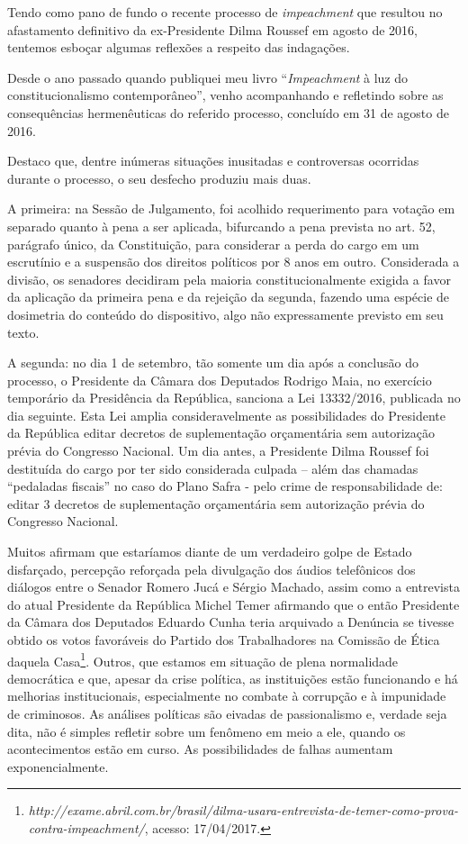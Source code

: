 Tendo como pano de fundo o recente processo de \emph{impeachment} que
resultou no afastamento definitivo da ex-Presidente Dilma Roussef em
agosto de 2016, tentemos esboçar algumas reflexões a respeito das
indagações.

Desde o ano passado quando publiquei meu livro ``\emph{Impeachment} à
luz do constitucionalismo contemporâneo'', venho acompanhando e
refletindo sobre as consequências hermenêuticas do referido processo,
concluído em 31 de agosto de 2016.

Destaco que, dentre inúmeras situações inusitadas e controversas
ocorridas durante o processo, o seu desfecho produziu mais duas.

A primeira: na Sessão de Julgamento, foi acolhido requerimento para
votação em separado quanto à pena a ser aplicada, bifurcando a pena
prevista no art. 52, parágrafo único, da Constituição, para considerar a
perda do cargo em um escrutínio e a suspensão dos direitos políticos por
8 anos em outro. Considerada a divisão, os senadores decidiram pela
maioria constitucionalmente exigida a favor da aplicação da primeira
pena e da rejeição da segunda, fazendo uma espécie de dosimetria do
conteúdo do dispositivo, algo não expressamente previsto em seu texto.

A segunda: no dia 1 de setembro, tão somente um dia após a conclusão do
processo, o Presidente da Câmara dos Deputados Rodrigo Maia, no
exercício temporário da Presidência da República, sanciona a Lei
13332/2016, publicada no dia seguinte. Esta Lei amplia consideravelmente
as possibilidades do Presidente da República editar decretos de
suplementação orçamentária sem autorização prévia do Congresso Nacional.
Um dia antes, a Presidente Dilma Roussef foi destituída do cargo por ter
sido considerada culpada -- além das chamadas ``pedaladas fiscais'' no
caso do Plano Safra - pelo crime de responsabilidade de: editar 3
decretos de suplementação orçamentária sem autorização prévia do
Congresso Nacional.

Muitos afirmam que estaríamos diante de um verdadeiro golpe de Estado
disfarçado, percepção reforçada pela divulgação dos áudios telefônicos
dos diálogos entre o Senador Romero Jucá e Sérgio Machado, assim como a
entrevista do atual Presidente da República Michel Temer afirmando que o
então Presidente da Câmara dos Deputados Eduardo Cunha teria arquivado a
Denúncia se tivesse obtido os votos favoráveis do Partido dos
Trabalhadores na Comissão de Ética daquela Casa\footnote{\emph{http://exame.abril.com.br/brasil/dilma-usara-entrevista-de-temer-como-prova-contra-impeachment/},
  acesso: 17/04/2017.}. Outros, que estamos em situação de plena
normalidade democrática e que, apesar da crise política, as instituições
estão funcionando e há melhorias institucionais, especialmente no
combate à corrupção e à impunidade de criminosos. As análises políticas
são eivadas de passionalismo e, verdade seja dita, não é simples
refletir sobre um fenômeno em meio a ele, quando os acontecimentos estão
em curso. As possibilidades de falhas aumentam exponencialmente.


